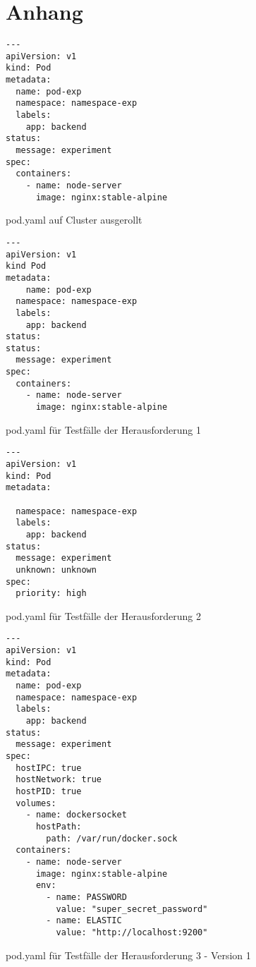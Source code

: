 \chapter{Anhang}\label{ch:appendix}

\begin{listing}[htp]
  \begin{verbatim}
---
apiVersion: v1
kind: Pod
metadata:
  name: pod-exp
  namespace: namespace-exp
  labels:
    app: backend  
status:
  message: experiment
spec: 
  containers:
    - name: node-server
      image: nginx:stable-alpine
    \end{verbatim}
  \caption{pod.yaml auf Cluster ausgerollt}
  \label{lst:pod-yaml-file}
\end{listing}

\begin{listing}[htp]
  \begin{verbatim}
---
apiVersion: v1
kind Pod
metadata:
    name: pod-exp
  namespace: namespace-exp
  labels:
    app: backend
status:    
status:
  message: experiment
spec:
  containers:
    - name: node-server
      image: nginx:stable-alpine
    \end{verbatim}
  \caption{pod.yaml für Testfälle der Herausforderung 1}
  \label{lst:pod-yaml-file}
\end{listing}

\begin{listing}[htp]
  \begin{verbatim}
---
apiVersion: v1
kind: Pod
metadata:
  
  namespace: namespace-exp
  labels:
    app: backend
status:    
  message: experiment
  unknown: unknown  
spec:
  priority: high
    \end{verbatim}
  \caption{pod.yaml für Testfälle der Herausforderung 2}
  \label{lst:pod-yaml-file}
\end{listing}

\begin{listing}[htp]
  \begin{verbatim}
---
apiVersion: v1
kind: Pod
metadata:
  name: pod-exp
  namespace: namespace-exp
  labels:
    app: backend
status:    
  message: experiment 
spec:
  hostIPC: true
  hostNetwork: true
  hostPID: true
  volumes:
    - name: dockersocket
      hostPath:
        path: /var/run/docker.sock
  containers:
    - name: node-server
      image: nginx:stable-alpine
      env:
        - name: PASSWORD
          value: "super_secret_password"
        - name: ELASTIC
          value: "http://localhost:9200"
  \end{verbatim}
  \caption{pod.yaml für Testfälle der Herausforderung 3 - Version 1}
  \label{lst:pod-yaml-file}
\end{listing}

